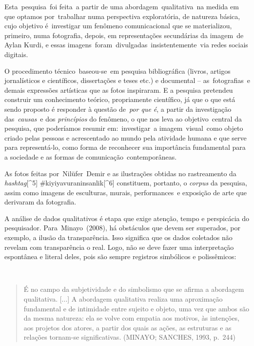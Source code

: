 \documentclass[
  letterpaper,
]{scrbook}
\begin{document}
Esta~pesquisa~foi feita~a partir de uma abordagem~qualitativa~na medida
em que optamos por~trabalhar numa perspectiva exploratória, de natureza
básica, cujo objetivo é~investigar um fenômeno comunicacional que se
materializou, primeiro, numa fotografia, depois, em representações
secundárias da imagem~de Aylan Kurdi, e essas
imagens~foram~divulgadas~insistentemente~via redes sociais digitais.

O procedimento técnico~baseou-se~em pesquisa bibliográfica (livros,
artigos jornalísticos e científicos, dissertações e teses etc.) e
documental -- as~fotografias~e demais expressões artísticas que as fotos
inspiraram. E a pesquisa pretendeu construir um conhecimento teórico,
propriamente científico, já que o que está sendo proposto é responder à
questão de~\emph{por que é}, a partir da investigação
das~\emph{causas}~e dos \emph{princípios} do fenômeno, o que nos leva ao
objetivo~central da pesquisa, que poderíamos resumir em:~investigar~a
imagem~visual~como objeto criado pelas pessoas e acrescentado ao mundo
pela atividade humana e que serve para representá-lo, como forma de
reconhecer sua importância fundamental para a sociedade e as formas de
comunicação~contemporâneas.

As fotos feitas por~Nilüfer~Demir e as ilustrações obtidas no
rastreamento da \emph{hashtag}{[}\^{}5{]}
\#kiyiyavuraninsanlik{[}\^{}6{]} constituem, portanto, o \emph{corpus}
da pesquisa, assim como imagens de esculturas, murais, performances~e
exposição de arte que derivaram da fotografia.~

A análise de dados qualitativos é etapa que exige atenção, tempo e
perspicácia do pesquisador. Para~Minayo~(2008), há obstáculos que devem
ser superados, por exemplo, a ilusão da transparência. Isso significa
que os dados coletados não revelam com transparência o real. Logo, não
se deve fazer uma interpretação espontânea e literal deles, pois são
sempre registros simbólicos e polissêmicos:~

~

\begin{quote}
É no campo da subjetividade e do simbolismo que se afirma a abordagem
qualitativa. {[}...{]} A abordagem qualitativa realiza uma aproximação
fundamental e de intimidade entre sujeito e objeto, uma vez que ambos
são da mesma natureza: ela se volve com empatia aos motivos, às
intenções, aos projetos dos atores, a partir dos quais as ações, as
estruturas e as relações tornam-se significativas. (MINAYO; SANCHES,
1993, p.~244)~
\end{quote}
\end{document}
